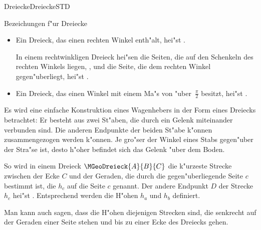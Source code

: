 \begin{MXContent}{Dreiecke}{Dreiecke}{STD}
\begin{MXInfo}{Bezeichungen f"ur Dreiecke}
\begin{itemize}
 \item Ein Dreieck, das einen rechten Winkel enth"alt, hei"st 
  .
 
  In einem rechtwinkligen Dreieck hei"sen die Seiten, die auf den Schenkeln des
  rechten Winkels liegen, ,
  und die Seite, die dem rechten Winkel gegen"uberliegt, hei"st
  .
       
 \item Ein Dreieck, das einen Winkel mit einem Ma"s von "uber~$\frac{\pi}{2}$
  besitzt, hei"st .
\end{itemize}
\end{MXInfo}

Es wird eine einfache Konstruktion eines Wagenhebers in der Form eines
Dreiecks betrachtet: Er besteht aus zwei St"aben, die durch ein Gelenk 
miteinander verbunden sind. Die anderen Endpunkte der beiden St"abe k"onnen
zusammengezogen werden k"onnen.
Je gro"ser der Winkel eines Stabs gegen"uber der Stra"se ist, desto 
h"oher befindet sich das Gelenk "uber dem Boden.

\begin{center}
\end{center}

So wird in einem Dreieck $\MGeoDreieck{A}{B}{C}$ die k"urzeste Strecke 
zwischen der Ecke $C$ und der Geraden, die durch die gegen"uberliegende 
Seite $c$ bestimmt ist, die 
 $h_c$ auf 
die Seite $c$ genannt. Der andere Endpunkt $D$ der Strecke $h_c$ hei"st 
.
Entsprechend werden die H"ohen $h_a$ und $h_b$ definiert.

Man kann auch sagen, dass die H"ohen diejenigen Strecken sind, die senkrecht 
auf der Geraden einer Seite stehen und bis zu einer Ecke des Dreiecks gehen.
\end{MXContent}


